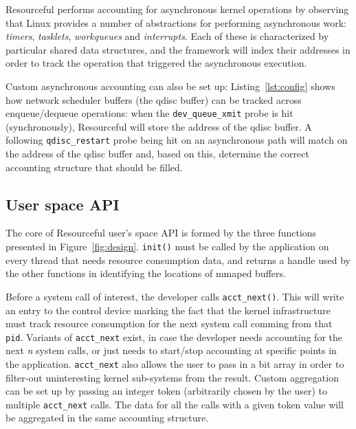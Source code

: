 \documentclass[letterpaper,twocolumn,10pt]{article}
\newcommand{\pname}{Resourceful}
\begin{document}
\pname{ }performs accounting for asynchronous kernel operations by observing
that Linux provides a number of abstractions for performing asynchronous work:
\emph{timers}, \emph{tasklets}, \emph{workqueues} and \emph{interrupts}. Each of
these is characterized by particular shared data structures, and the framework
will index their addresses in order to track the operation that triggered the
asynchronous execution.

Custom asynchronous accounting can also be set up: Listing~\ref{lst:config}
shows how network scheduler buffers (the qdisc buffer) can be tracked across
enqueue/dequeue operations: when the \texttt{dev\_queue\_xmit} probe is hit
(synchronously), \pname{ }will store the address of the qdisc buffer. A
following \texttt{qdisc\_restart} probe being hit on an asynchronous path will
match on the address of the qdisc buffer and, based on this, determine the
correct accounting structure that should be filled.


\subsection{User space API}
The core of \pname{ }user's space API is formed by the three functions presented
in Figure~\ref{fig:design}. \texttt{init()} must be called by the application on
every thread that needs resource consumption data, and returns a handle used by
the other functions in identifying the locations of mmaped buffers. 

Before a system call of interest, the developer calls
\texttt{acct\_next()}. This will write an entry to the control device marking
the fact that the kernel infrastructure must track resource consumption for the
next system call comming from that \texttt{pid}. Variants of
\texttt{acct\_next} exist, in case the developer needs accounting for the next
\textit{n} system calls, or just needs to start/stop accounting at specific
points in the application. \texttt{acct\_next} also allows the user to pass in a
bit array in order to filter-out uninteresting kernel sub-systems from the
result. Custom aggregation can be set up by passing an integer token
(arbitrarily chosen by the user) to multiple \texttt{acct\_next} calls. The data
for all the calls with a given token value will be aggregated in the same
accounting structure.
\end{document}
